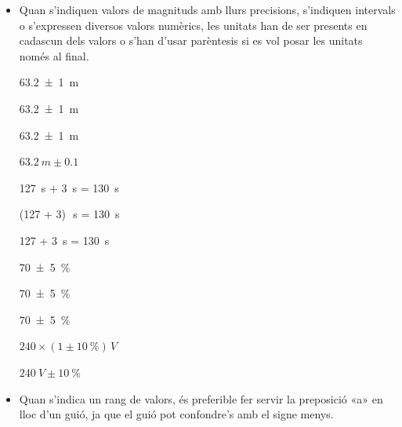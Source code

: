 \begin{itemize}

\item Quan s'indiquen valors de magnituds amb llurs precisions,
s'indiquen intervals o s'expressen diversos valors numèrics, les
unitats han de ser presents en cadascun dels valors o s'han d'usar
parèntesis si es vol posar les unitats només al final.

\textcolor{Green}\faCheckSquare{} \qty[separate-uncertainty, separate-uncertainty-units = repeat]{63,2(1)}{m}

\textcolor{Green}\faCheckSquare{} \qty[separate-uncertainty]{63,2(1)}{m}

\textcolor{Blue}\faExclamationTriangle{} \qty[separate-uncertainty, separate-uncertainty-units = single]{63,2(1)}{m}

\textcolor{Blue}\faExclamationTriangle{}  $\qty{63,2}{m} \pm \num{0,1}$

\textcolor{Green}\faCheckSquare{} 

\textcolor{Green}\faCheckSquare{} 

\textcolor{Blue}\faExclamationTriangle{} 


\textcolor{Green}\faCheckSquare{} \qty{127}{s} + \qty{3}{s} = \qty{130}{s}

\textcolor{Green}\faCheckSquare{}  (127 + 3)\unit{\,s} = \qty{130}{s}

\textcolor{Blue}\faExclamationTriangle{}  127 + \qty{3}{s} = \qty{130}{s}


\textcolor{Green}\faCheckSquare{} \qty[separate-uncertainty, separate-uncertainty-units = repeat]{70(5)}{\percent}

\textcolor{Green}\faCheckSquare{} \qty[separate-uncertainty]{70(5)}{\percent}

\textcolor{Blue}\faExclamationTriangle{} \qty[separate-uncertainty, separate-uncertainty-units = single]{70(5)}{\percent}


\textcolor{Green}\faCheckSquare{} $240 \times (1 \pm \qty{10}{\percent})\unit{\,V}$

\textcolor{Blue}\faExclamationTriangle{}  $\qty{240}{V} \pm \qty{10}{\percent}$


\item Quan s'indica un rang de valors, és preferible fer servir la preposició «a» en lloc d'un guió, ja que el guió pot confondre's amb el signe menys.


\end{itemize}
